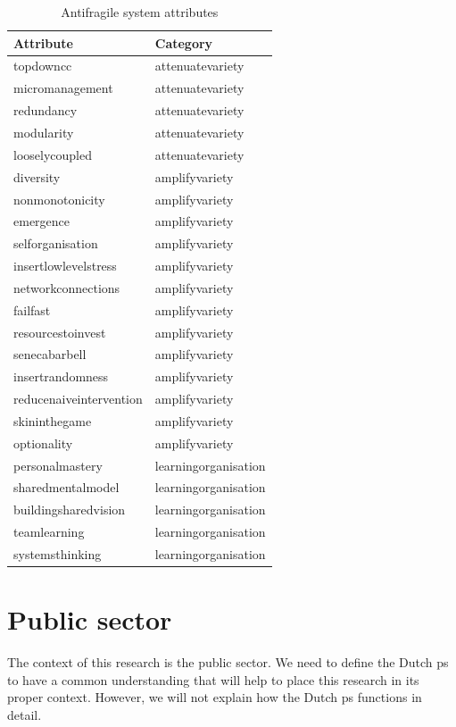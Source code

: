 \begin{longtable}{@{}p{}p{}@{}}
	\toprule%
	\textbf{Attribute} & \textbf{Category} \\%
	\midrule%
	\endhead%
	\hline
	\endfoot%
	\caption[Antifragile system attributes]{Antifragile system attributes}
	\label{tab:attributesofantifragile}
	\endlastfoot%
	\Gls{topdowncc} & \Gls{attenuatevariety} \\%
	\Gls{micromanagement} & \Gls{attenuatevariety} \\%
	\Gls{redundancy} & \Gls{attenuatevariety} \\%
	\Gls{modularity} & \Gls{attenuatevariety} \\%
	\Gls{looselycoupled} & \Gls{attenuatevariety} \\%
	\Gls{diversity} & \Gls{amplifyvariety} \\%
	\Gls{nonmonotonicity} & \Gls{amplifyvariety} \\%
	\Gls{emergence} & \Gls{amplifyvariety} \\%
	\Gls{selforganisation} & \Gls{amplifyvariety} \\%
	\Gls{insertlowlevelstress} & \Gls{amplifyvariety} \\%
	\Gls{networkconnections}  & \Gls{amplifyvariety} \\%
	\Gls{failfast} & \Gls{amplifyvariety} \\%
	\Gls{resourcestoinvest} & \Gls{amplifyvariety} \\%
	\Gls{senecabarbell} & \Gls{amplifyvariety} \\%
	\Gls{insertrandomness} & \Gls{amplifyvariety} \\%
	\Gls{reducenaiveintervention} & \Gls{amplifyvariety} \\%
	\Gls{skininthegame} & \Gls{amplifyvariety} \\%
	\Gls{optionality} &  \Gls{amplifyvariety} \\%
	\Gls{personalmastery} &  \Gls{learningorganisation} \\%
	\Gls{sharedmentalmodel} &  \Gls{learningorganisation} \\%
	\Gls{buildingsharedvision} &  \Gls{learningorganisation} \\%
	\Gls{teamlearning} &  \Gls{learningorganisation} \\%
	\Gls{systemsthinking} &  \Gls{learningorganisation} \\%
	\bottomrule%
\end{longtable}

\section{Public sector}
\label{sec:tbpublicsector}
The context of this research is the public sector. We need to define the Dutch \gls{ps} to have a common understanding that will help to place this research in its proper context. However, we will not explain how the Dutch \gls{ps} functions in detail.

